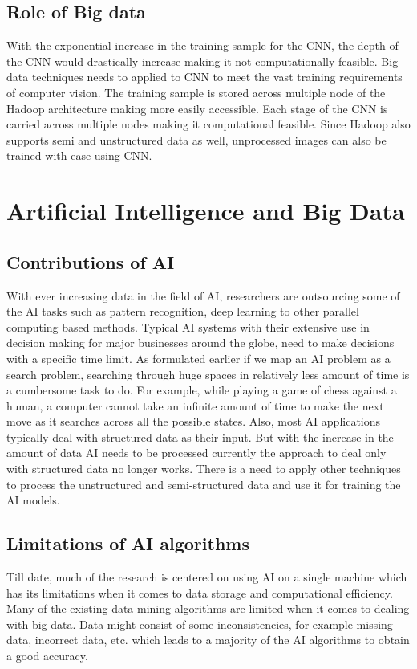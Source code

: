 \documentclass[sigconf]{acmart}
\begin{document}
\subsection{Role of Big data}
With the exponential increase in the training sample for the CNN, the depth of the CNN would drastically increase making it not computationally feasible. Big data techniques needs to applied to CNN to meet the vast training requirements of computer vision. The training sample is stored across multiple node of the Hadoop architecture making more easily accessible. Each stage of the CNN is carried across multiple nodes making it computational feasible. Since Hadoop also supports semi and unstructured data as well, unprocessed images can also be trained with ease using CNN.\cite{Christian}

\section{Artificial Intelligence and Big Data}
\subsection{Contributions of AI}
With ever increasing data in the field of AI, researchers are outsourcing some of the AI tasks such as pattern recognition, deep learning to other parallel computing based methods. Typical AI systems with their extensive use in decision making for major businesses around the globe,  need to make decisions with a specific time limit. As formulated earlier if we map an AI problem as a search problem, searching through huge spaces in relatively less amount of time is a cumbersome task to do. For example, while playing a game of chess against a human, a computer cannot take an infinite amount of time to make the next move as it searches across all the possible states. Also, most AI applications typically deal with structured data as their input. But with the increase in the amount of data AI needs to be processed currently the approach to deal only with structured data no longer works. There is a need to apply other techniques to process the unstructured and semi-structured data and use it for training the AI models.\cite{OLeary}

\subsection{Limitations of AI algorithms}
Till date, much of the research is centered on using AI on a single machine which has its limitations when it comes to data storage and computational efficiency. Many of the existing data mining algorithms are limited when it comes to dealing with big data. Data might consist of some inconsistencies, for example missing data, incorrect data, etc. which leads to a majority of the AI algorithms to obtain a good accuracy\cite{OLeary}. 
\end{document}
